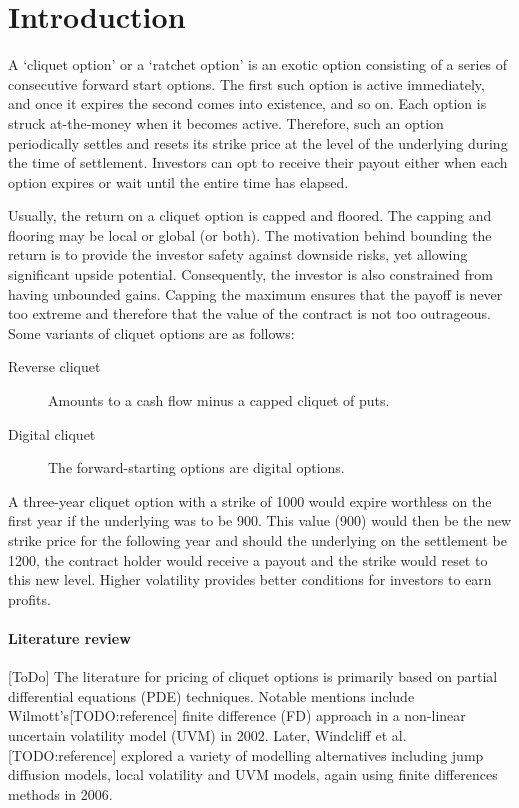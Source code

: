 

\section{Introduction}
\label{sec:sp-clq-intro}

A `cliquet option' or a `ratchet option' is an exotic option consisting of a series of consecutive forward start options. The first such option is active immediately, and once it expires the second comes into existence, and so on. Each option is struck at-the-money when it becomes active. Therefore, such an option periodically settles and resets its strike price at the level of the underlying during the time of settlement. Investors can opt to receive their payout either when each option expires or wait until the entire time has elapsed.

Usually, the return on a cliquet option is capped and floored. The capping and flooring may be local or global (or both). The motivation behind bounding the return is to provide the investor safety against downside risks, yet allowing significant upside potential. Consequently, the investor is also constrained from having unbounded gains. Capping the maximum ensures that the payoff is never too extreme and therefore that the value of the contract is not too outrageous. Some variants of cliquet options are as follows:
\begin{description}
	\item[Reverse cliquet] Amounts to a cash flow minus a capped cliquet of puts.
	\item[Digital cliquet] The forward-starting options are digital options.
\end{description}

\begin{eg} %
	A three-year cliquet option with a strike of 1000 would expire worthless on the first year if the underlying was to be 900. This value (900) would then be the new strike price for the following year and should the underlying on the settlement be 1200, the contract holder would receive a payout and the strike would reset to this new level. Higher volatility provides better conditions for investors to earn profits.
\end{eg}



\paragraph{Literature review}
[ToDo] The literature for pricing of cliquet options is primarily based on partial differential equations (PDE) techniques. Notable mentions include Wilmott's[TODO:reference] finite difference (FD) approach in a non-linear uncertain volatility model (UVM) in 2002. Later, Windcliff et al.[TODO:reference] explored a variety of modelling alternatives including jump diffusion models, local volatility and UVM models, again using finite differences
methods in 2006.


